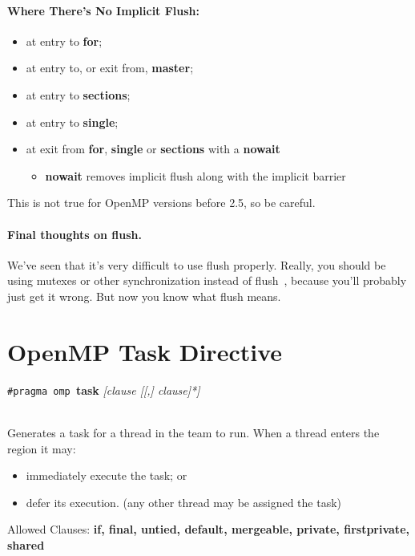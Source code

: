 \paragraph{Where There's No Implicit Flush:}
  \begin{itemize}[noitemsep]
    \item at entry to {\bf for};
    \item at entry to, or exit from, {\bf master};
    \item at entry to {\bf sections};
    \item at entry to {\bf single};
    \item at exit from {\bf for}, {\bf single} or {\bf sections} with a {\bf nowait}
      \begin{itemize}
        \item {\bf nowait} removes implicit flush along with the implicit barrier
      \end{itemize}
  \end{itemize}

This is not true for OpenMP versions before 2.5, so be careful.

\paragraph{Final thoughts on flush.} We've seen that it's very difficult to use flush properly. Really, you should be using mutexes or other synchronization instead of flush~\cite{flush}, because you'll probably just get it wrong. But now you know what flush means.

\section*{OpenMP Task Directive}

  \begin{center}
    {\tt \#pragma omp }{\bf task} {\it [clause [[,] clause]*]}
  \end{center}~\\

Generates a task for a thread in the team to run.
     When a thread enters the region it may:
\begin{itemize}
        \item immediately execute the task; or
        \item defer its execution. (any other thread may be assigned the task)
\end{itemize}

  Allowed Clauses: {\bf if, final, untied, default, mergeable, private,
  firstprivate, shared}

